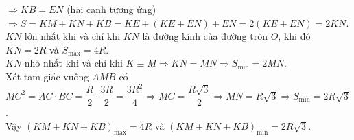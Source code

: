 \begin{ex}
{\begin{enumerate}[a)]
		$\Rightarrow KB=EN$ (hai cạnh tương ứng)\\
		$\Rightarrow S=KM+KN+KB=KE+(KE+EN)+EN=2(KE+EN)=2KN$.\\
		$KN$ lớn nhất khi và chỉ khi $KN$ là đường kính của đường tròn $O$, khi đó $KN=2R$ và $S_{\max}=4R$.\\
		$KN$ nhỏ nhất khi và chỉ khi $K\equiv M\Rightarrow KN=MN\Rightarrow S_{\min}=2MN$.\\
		Xét tam giác vuông $AMB$ có $MC^2=AC\cdot BC=\dfrac{R}{2}\cdot \dfrac{3R}{2}=\dfrac{3R^2}{4}\Rightarrow MC=\dfrac{R\sqrt{3}}{2}\Rightarrow MN=R\sqrt{3}\Rightarrow S_{\min}=2R\sqrt{3}$.\\
		Vậy $(KM+KN+KB)_{\max}=4R$ và $(KM+KN+KB)_{\min}=2R\sqrt{3}$.		
	\end{enumerate}}
\end{ex}



